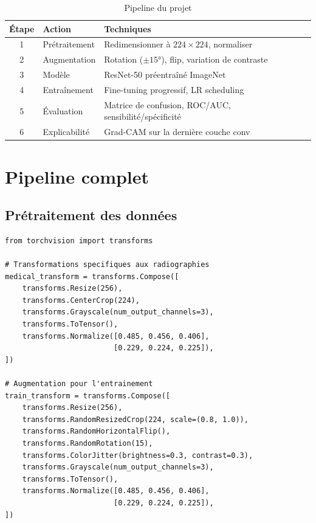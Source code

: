 \documentclass[a4paper,11pt,twoside]{book}
\begin{document}
\begin{table}[H]
\centering
\caption{Pipeline du projet}
\begin{tabularx}{\textwidth}{c l X}
\toprule
\textbf{Étape} & \textbf{Action} & \textbf{Techniques} \\
\midrule
1 & Prétraitement & Redimensionner à $224 \times 224$, normaliser \\
2 & Augmentation & Rotation ($\pm 15°$), flip, variation de contraste \\
3 & Modèle & ResNet-50 préentraîné ImageNet \\
4 & Entraînement & Fine-tuning progressif, LR scheduling \\
5 & Évaluation & Matrice de confusion, ROC/AUC, sensibilité/spécificité \\
6 & Explicabilité & Grad-CAM sur la dernière couche conv \\
\bottomrule
\end{tabularx}
\end{table}

\section{Pipeline complet}

\subsection{Prétraitement des données}

\begin{lstlisting}[caption={Transformations pour l'imagerie médicale}]
from torchvision import transforms

# Transformations specifiques aux radiographies
medical_transform = transforms.Compose([
    transforms.Resize(256),
    transforms.CenterCrop(224),
    transforms.Grayscale(num_output_channels=3),
    transforms.ToTensor(),
    transforms.Normalize([0.485, 0.456, 0.406],
                         [0.229, 0.224, 0.225]),
])

# Augmentation pour l'entrainement
train_transform = transforms.Compose([
    transforms.Resize(256),
    transforms.RandomResizedCrop(224, scale=(0.8, 1.0)),
    transforms.RandomHorizontalFlip(),
    transforms.RandomRotation(15),
    transforms.ColorJitter(brightness=0.3, contrast=0.3),
    transforms.Grayscale(num_output_channels=3),
    transforms.ToTensor(),
    transforms.Normalize([0.485, 0.456, 0.406],
                         [0.229, 0.224, 0.225]),
])
\end{lstlisting}
\end{document}
